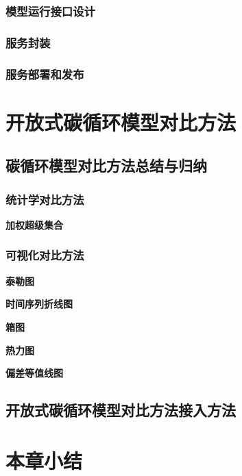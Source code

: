 \subsubsection{模型运行接口设计}

\subsubsection{服务封装}

\subsubsection{服务部署和发布}


\section{开放式碳循环模型对比方法}

\subsection{碳循环模型对比方法总结与归纳}
\subsubsection{统计学对比方法}
\textbf{加权超级集合}

\subsubsection{可视化对比方法}
\textbf{泰勒图}

\textbf{时间序列折线图}

\textbf{箱图}

\textbf{热力图}

\textbf{偏差等值线图}

\subsection{开放式碳循环模型对比方法接入方法}

\section{本章小结}
